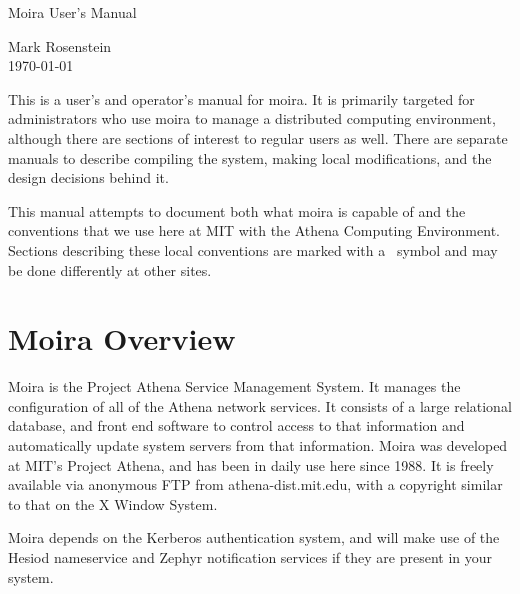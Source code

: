 \newpage
{}
\setlength{\headrulewidth}{0.4pt}
\cfoot{}
\rfoot{\today}
\tableofcontents
\newpage

\vspace{2 in}
{\Large \hfill Moira User's Manual}

{\large \hfill Mark Rosenstein\\

\hfill \today\\}

\vspace{1 in}
This is a user's and operator's manual for moira.  It is primarily
targeted for administrators who use moira to manage a distributed
computing environment, although there are sections of interest to
regular users as well.  There are separate manuals to describe
compiling the system, making local modifications, and the design
decisions behind it.

This manual attempts to document both what moira is capable of and the
conventions that we use here at MIT with the Athena Computing
Environment.  Sections describing these local conventions are marked
with a \athena\ symbol and may be done differently at other sites.

\chapter{Moira Overview}
\renewcommand{\thepage}{\arabic{page}}
\setcounter{page}{1}

Moira is the Project Athena Service Management System.  It manages the
configuration of all of the Athena network services.  It consists of a
large relational database, and front end software to control access to
that information and automatically update system servers from that
information.  Moira was developed at MIT's Project Athena, and has
been in daily use here since 1988.  It is freely available via
anonymous FTP from athena-dist.mit.edu, with a copyright similar to
that on the X Window System.

Moira depends on the Kerberos authentication system, and will make use
of the Hesiod nameservice and Zephyr notification services if they are
present in your system.

